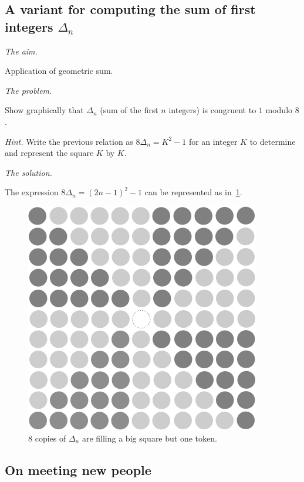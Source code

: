 \subsection{A variant for computing the sum of first integers $\Delta_n$}

\noindent \textit{The aim.}

Application of geometric sum.
\medskip

\noindent \textit{The problem.}

Show graphically that $\Delta_n$ (sum of the first $n$ integers) is congruent to $1$ modulo $8$.
\medskip

\noindent \textit{Hint.}
Write the previous relation as $8 \Delta_n = K^2 -1$
for an integer $K$ to determine and represent the square $K$ by $K$. 

\noindent \textit{The solution.}

The expression $8 \Delta_n = (2n-1)^2 -1$ can be represented as in~\ref{fig:Sum8deltas}.
\begin{figure}[ht]
\begin{center}
       \includegraphics[scale=0.4]{FiguresMaths/Delta8}
\caption{8 copies of $\Delta_n$ are filling a big square but one token.}
       \label{fig:Sum8deltas}
\end{center}
\end{figure}



\subsection{On meeting new people}

